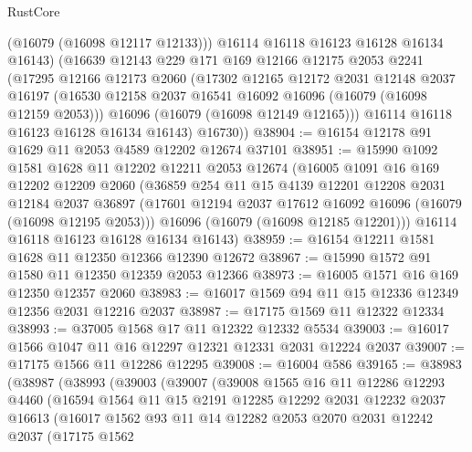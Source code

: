 \begin{lexlean}{RustCore}
\begin{coremodule}
          (@16079 (@16098 @12117 @12133)))
        @16114
        @16118
        @16123
        @16128
        @16134
        @16143)
      (@16639
        @12143
        @229
        @171
        @169
        @12166
        @12175
        @2053
        @2241
        (@17295
          @12166
          @12173
          @2060
          (@17302
            @12165
            @12172
            @2031
            @12148
            @2037
            @16197
            (@16530 @12158 @2037 @16541 @16092 @16096 (@16079 (@16098 @12159 @2053)))
            @16096
            (@16079 (@16098 @12149 @12165)))
          @16114
          @16118
          @16123
          @16128
          @16134
          @16143)
        @16730))
@38904 := @16154 @12178 @91 @1629 @11 @2053 @4589 @12202 @12674 @37101
@38951 := @15990
    @1092
    @1581
    @1628
    @11
    @12202
    @12211
    @2053
    @12674
    (@16005
      @1091
      @16
      @169
      @12202
      @12209
      @2060
      (@36859
        @254
        @11
        @15
        @4139
        @12201
        @12208
        @2031
        @12184
        @2037
        @36897
        (@17601 @12194 @2037 @17612 @16092 @16096 (@16079 (@16098 @12195 @2053)))
        @16096
        (@16079 (@16098 @12185 @12201)))
      @16114
      @16118
      @16123
      @16128
      @16134
      @16143)
@38959 := @16154 @12211 @1581 @1628 @11 @12350 @12366 @12390 @12672
@38967 := @15990 @1572 @91 @1580 @11 @12350 @12359 @2053 @12366
@38973 := @16005 @1571 @16 @169 @12350 @12357 @2060
@38983 := @16017 @1569 @94 @11 @15 @12336 @12349 @12356 @2031 @12216 @2037
@38987 := @17175 @1569 @11 @12322 @12334
@38993 := @37005 @1568 @17 @11 @12322 @12332 @5534
@39003 := @16017 @1566 @1047 @11 @16 @12297 @12321 @12331 @2031 @12224 @2037
@39007 := @17175 @1566 @11 @12286 @12295
@39008 := @16004 @586
@39165 := @38983
    (@38987
      (@38993
        (@39003
          (@39007
            (@39008
              @1565
              @16
              @11
              @12286
              @12293
              @4460
              (@16594
                @1564
                @11
                @15
                @2191
                @12285
                @12292
                @2031
                @12232
                @2037
                @16613
                (@16017
                  @1562
                  @93
                  @11
                  @14
                  @12282
                  @2053
                  @2070
                  @2031
                  @12242
                  @2037
                  (@17175
                    @1562

\end{coremodule}
\end{lexlean}
